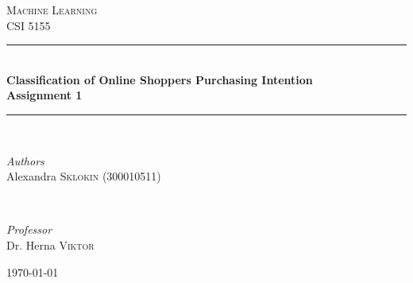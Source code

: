 \documentclass{article}
\begin{document}
\begin{titlepage} %
	\newcommand{\HRule}{\rule{\linewidth}{0.5mm}} %
	
	\center %
	
	
	\textsc{\Large Machine Learning}\\[0.5cm] %
	
	\textsc{\large CSI 5155}\\[0.5cm] %
	
	\HRule\\[0.4cm]
	{\huge\bfseries Classification of Online Shoppers Purchasing Intention}\\[0.4cm] %
	{\bfseries Assignment 1}\\[0.2cm]
	
	\HRule\\[1.5cm]
	
	
	\begin{minipage}[t]{0.5\textwidth}
		\begin{flushleft}
			\large
			\textit{Authors}\\
			Alexandra \textsc{Sklokin} {\small(300010511)}\\
		\end{flushleft}
	\end{minipage}
	~
	\begin{minipage}[t]{0.4\textwidth}
		\begin{flushright}
			\large
			\textit{Professor}\\
			Dr. Herna \textsc{Viktor} %
		\end{flushright}
	\end{minipage}
\vfill


	
	
	\vfill\vfill\vfill %
	
	{\large\today} %

	\vfill %
	
\end{titlepage}
\end{document}
